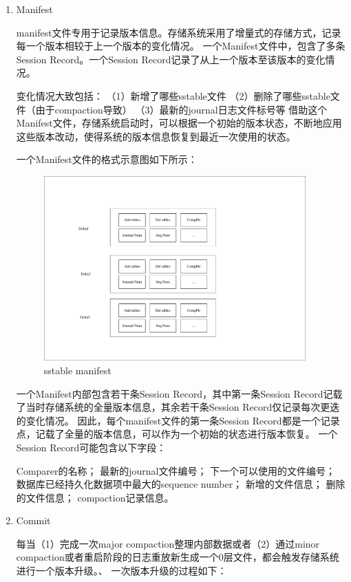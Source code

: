 		\begin{enumerate}
		
		\item Manifest

manifest文件专用于记录版本信息。存储系统采用了增量式的存储方式，记录每一个版本相较于上一个版本的变化情况。
一个Manifest文件中，包含了多条Session Record。一个Session Record记录了从上一个版本至该版本的变化情况。

变化情况大致包括：
（1）新增了哪些sstable文件
（2）删除了哪些sstable文件（由于compaction导致）
（3）最新的journal日志文件标号等
借助这个Manifest文件，存储系统启动时，可以根据一个初始的版本状态，不断地应用这些版本改动，使得系统的版本信息恢复到最近一次使用的状态。

一个Manifest文件的格式示意图如下所示：
			
\begin{figure}[H]
	\centering
	\includegraphics[width=0.95\textwidth]{pdf/manifest.pdf}
	\caption{sstable manifest}
	\label{sstable_manifest}
\end{figure}
			

一个Manifest内部包含若干条Session Record，其中第一条Session Record记载了当时存储系统的全量版本信息，其余若干条Session Record仅记录每次更迭的变化情况。
因此，每个manifest文件的第一条Session Record都是一个记录点，记载了全量的版本信息，可以作为一个初始的状态进行版本恢复。
一个Session Record可能包含以下字段：

Comparer的名称；
最新的journal文件编号；
下一个可以使用的文件编号；
数据库已经持久化数据项中最大的sequence number；
新增的文件信息；
删除的文件信息；
compaction记录信息。
		\item Commit

每当（1）完成一次major compaction整理内部数据或者（2）通过minor compaction或者重启阶段的日志重放新生成一个0层文件，都会触发存储系统进行一个版本升级。、
一次版本升级的过程如下：
		

\end{enumerate}
